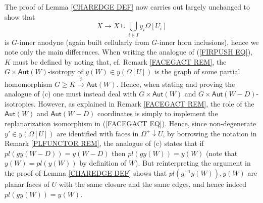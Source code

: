 \documentclass[a4paper,10pt,draft]{article}%
\begin{document}
\begin{remark}
The proof of Lemma \ref{CHAREDGE DEF} now carries out largely  unchanged to show that 
\begin{equation}
	X \to X \cup \bigcup_{i \in I} y_i\Omega[U_i]
\end{equation}
is $G$-inner anodyne (again built cellularly from $G$-inner horn inclusions), hence we note only the main differences.
When writing the analogue of (\ref{FIRPUSH EQ}), 
$K$ must be defined by noting that, cf. Remark \ref{FACEGACT REM},
the $G \times \mathsf{Aut}(W)$-isotropy of 
$y(W) \in y(\Omega[U])$
is the graph of some partial homomorphism
$G \geq K \xrightarrow{\phi} \mathsf{Aut}(W)$.
Hence, when stating and proving the analogue of (c) one must instead deal with
$G \times \mathsf{Aut}(W)$ and $G \times \mathsf{Aut}(W-D)$-isotropies.
However, as explained in Remark \ref{FACEGACT REM}, the role of the $\mathsf{Aut}(W)$ and $\mathsf{Aut}(W-D)$ coordinates is simply to implement the replanarization isomorphism in (\ref{FACEGACT EQ}). 
Hence, since non-degenerate $y' \in y(\Omega[U])$ are identified with faces in $\Omega^+\downarrow U$, by borrowing the notation in 
Remark \ref{PLFUNCTOR REM}, the analogue of (c) states that if
$pl(g y (W-D)) = y(W-D)$ then $pl(g y (W)) = y(W)$ 
(note that $y(W)=pl(y(W))$ by definition of $W$).
But reinterpreting the argument in the proof of Lemma \ref{CHAREDGE DEF}
shows that $pl(g^{-1} y (W)),y(W)$ are planar faces of $U$ with the same closure and the same edges, and hence indeed 
$pl(g y (W))=y(W)$.
\end{remark}

\end{document}
